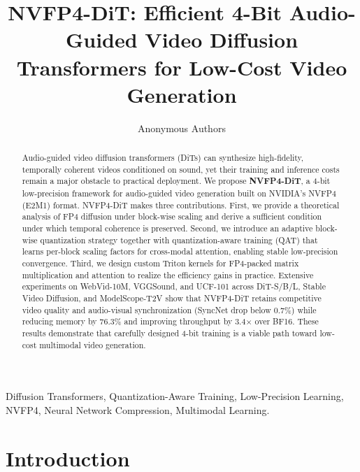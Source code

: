 \documentclass[journal,twoside]{IEEEtran}
\theoremstyle{definition}
\theoremstyle{remark}
\begin{document}
\title{NVFP4-DiT: Efficient 4-Bit Audio-Guided Video Diffusion Transformers for Low-Cost Video Generation}

\author{Anonymous Authors}

\maketitle

\begin{abstract}
Audio-guided video diffusion transformers (DiTs) can synthesize high-fidelity, temporally coherent videos conditioned on sound, yet their training and inference costs remain a major obstacle to practical deployment. We propose \textbf{NVFP4-DiT}, a 4-bit low-precision framework for audio-guided video generation built on NVIDIA's NVFP4 (E2M1) format. NVFP4-DiT makes three contributions. First, we provide a theoretical analysis of FP4 diffusion under block-wise scaling and derive a sufficient condition under which temporal coherence is preserved. Second, we introduce an adaptive block-wise quantization strategy together with quantization-aware training (QAT) that learns per-block scaling factors for cross-modal attention, enabling stable low-precision convergence. Third, we design custom Triton kernels for FP4-packed matrix multiplication and attention to realize the efficiency gains in practice. Extensive experiments on WebVid-10M, VGGSound, and UCF-101 across DiT-S/B/L, Stable Video Diffusion, and ModelScope-T2V show that NVFP4-DiT retains competitive video quality and audio-visual synchronization (SyncNet drop below 0.7\%) while reducing memory by 76.3\% and improving throughput by 3.4$\times$ over BF16. These results demonstrate that carefully designed 4-bit training is a viable path toward low-cost multimodal video generation.
\end{abstract}

\begin{IEEEkeywords}
Diffusion Transformers, Quantization-Aware Training, Low-Precision Learning, NVFP4, Neural Network Compression, Multimodal Learning.
\end{IEEEkeywords}

\section{Introduction}
\end{document}
